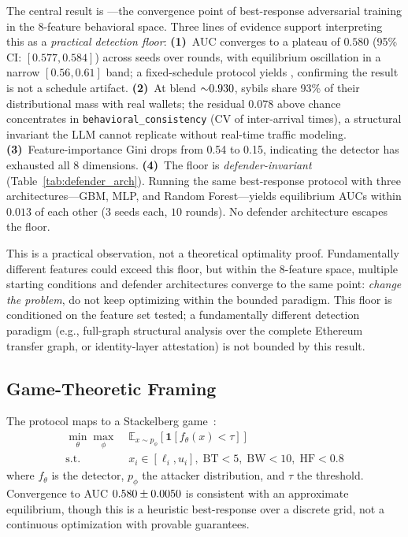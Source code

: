 \documentclass[sigconf,nonacm=false]{acmart}
\begin{document}
The central result is \textbf{\bestResponseAucFloorMean{}}---the convergence point of best-response adversarial training in the 8-feature behavioral space. Three lines of evidence support interpreting this as a \emph{practical detection floor}:
\textbf{(1)}~AUC converges to a plateau of $0.580$ (95\% CI: $[0.577, 0.584]$) across \bestResponseNSeeds{} seeds over \bestResponseNRounds{} rounds, with equilibrium oscillation in a narrow $[0.56, 0.61]$ band; a fixed-schedule protocol yields \equilibriumFinalAuc{}, confirming the result is not a schedule artifact.
\textbf{(2)}~At blend ${\sim}0.930{}$, sybils share 93\% of their distributional mass with real wallets; the residual 0.078 above chance concentrates in \texttt{behavioral\_consistency} (CV of inter-arrival times), a structural invariant the LLM cannot replicate without real-time traffic modeling.
\textbf{(3)}~Feature-importance Gini drops from 0.54 to 0.15, indicating the detector has exhausted all 8 dimensions.
\textbf{(4)}~The floor is \emph{defender-invariant} (Table~\ref{tab:defender_arch}). Running the same best-response protocol with three architectures---GBM, MLP, and Random Forest---yields equilibrium AUCs within $0.013$ of each other ($3$ seeds each, $10$ rounds). No defender architecture escapes the floor.

This is a practical observation, not a theoretical optimality proof. Fundamentally different features could exceed this floor, but within the 8-feature space, multiple starting conditions and defender architectures converge to the same point: \emph{change the problem}, do not keep optimizing within the bounded paradigm.
This floor is conditioned on the feature set tested; a fundamentally different detection paradigm (e.g., full-graph structural analysis over the complete Ethereum transfer graph, or identity-layer attestation) is not bounded by this result.

\subsection{Game-Theoretic Framing}

The protocol maps to a Stackelberg game~\cite{bruckner2011stackelberg,osborne1994game}:
\begin{align}
\min_{\theta} \max_{\phi} \; & \mathbb{E}_{x \sim p_\phi} \left[ \mathbf{1}[f_\theta(x) < \tau] \right] \label{eq:stackelberg} \\
\text{s.t.} \quad & x_i \in [\ell_i, u_i], \; \text{BT}{<}5, \; \text{BW}{<}10, \; \text{HF}{<}0.8 \nonumber
\end{align}
where $f_\theta$ is the detector, $p_\phi$ the attacker distribution, and $\tau$ the threshold. Convergence to AUC $0.580{} \pm 0.0050{}$ is consistent with an approximate equilibrium, though this is a heuristic best-response over a discrete grid, not a continuous optimization with provable guarantees.
\end{document}
